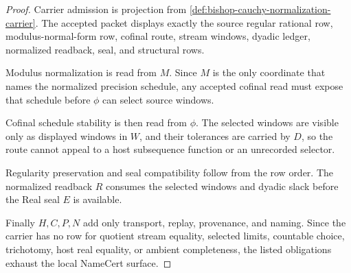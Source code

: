 \begin{proof}
Carrier admission is projection from \autoref{def:bishop-cauchy-normalization-carrier}. The accepted packet displays exactly the source regular rational row, modulus-normal-form row, cofinal route, stream windows, dyadic ledger, normalized readback, seal, and structural rows.

Modulus normalization is read from $M$. Since $M$ is the only coordinate that names the normalized precision schedule, any accepted cofinal read must expose that schedule before $\phi$ can select source windows.

Cofinal schedule stability is then read from $\phi$. The selected windows are visible only as displayed windows in $W$, and their tolerances are carried by $D$, so the route cannot appeal to a host subsequence function or an unrecorded selector.

Regularity preservation and seal compatibility follow from the row order. The normalized readback $R$ consumes the selected windows and dyadic slack before the Real seal $E$ is available.

Finally $H,C,P,N$ add only transport, replay, provenance, and naming. Since the carrier has no row for quotient stream equality, selected limits, countable choice, trichotomy, host real equality, or ambient completeness, the listed obligations exhaust the local NameCert surface.
\end{proof}

